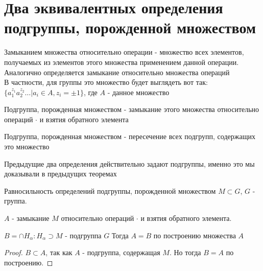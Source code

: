 \section{Два эквивалентных определения подгруппы, порожденной множеством}
\begin{Def}
	Замыканием множества относительно операции - множество всех элементов, получаемых из элементов этого множества применением данной операции. \\
	Аналогично определяется замыкание относительно множества операций \\
	В частности, для группы это множество будет выглядеть вот так: $\{a_1^{z_1}a_2^{z_2}\dots | a_i \in A, z_i = \pm 1 \}$, где $A$ - данное множество
\end{Def}

\begin{Def}
	Подгруппа, порожденная множеством - замыкание этого множества относительно операций $\cdot$ и взятия обратного элемента \\
\end{Def}

\begin{Def}
	Подгруппа, порожденная множеством - пересечение всех подгрупп, содержащих это множество \\
\end{Def}

\begin{Rem}
	Предыдущие два определения действительно задают подгруппы, именно это мы доказывали в предыдущих теоремах  \\
\end{Rem}

\begin{theorem} {Равносильность определений подгруппы, порожденной множеством}
	$M \subset G$, $G$ - группа.
	
	$A$ - замыкание $M$ относительно операций $\cdot$ и взятия обратного элемента.
	
	$B = \cap H_\alpha : H_\alpha \supset M$ - подгруппа $G$
	Тогда $A = B$ по построению множества $A$
\end{theorem}
\begin{proof}
	$B \subset A$, так как $A$ - подгруппа, содержащая $M$.
	Но тогда $B = A$ по построению.	
\end{proof}
